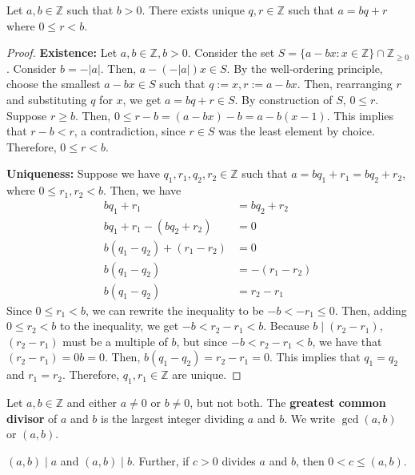 \documentclass [12pt] {article}
\newcommand{\Z}{\mathbb{Z}}
\newenvironment{definition}[1]{\begin{tcolorbox}[title={Definition: #1},colback=blue!5!white,colframe=black!75!blue]}{\end{tcolorbox}}
\newenvironment{theorem}[1]{\begin{tcolorbox}[title={Theorem #1},colback=green!5!white,colframe=black!75!green]}{\end{tcolorbox}}
\renewcommand{\bf}[1]{\textbf{{#1}}}
\begin{document}
\begin{theorem}{(Division Algorithm)}
    \label{thm:divalgo}
    Let $a, b \in \Z$ such that $b > 0$. There exists unique $q, r \in \Z$ such that $a = bq + r$
    where $0 \leq r < b$.
\end{theorem}
\begin{proof}
    \bf{Existence:} 
    Let $a, b \in \Z, b > 0$. Consider the set $S = \{ a - bx : x \in \Z \} \cap \Z_{\geq 0}$.
    Consider $b = -|a|$. Then, $a - (-|a|)x \in S$. By the well-ordering principle, choose the 
    smallest $a - bx \in S$ such that $q := x, r := a - bx$. Then, rearranging $r$ and substituting
    $q$ for $x$, we get $a = bq + r \in S$. By construction of $S$, $0 \leq r$. Suppose $r \geq b$.
    Then, $0 \leq r - b = (a - bx) - b = a - b(x - 1)$. This implies that $r - b < r$, a
    contradiction, since $r \in S$ was the least element by choice. Therefore, $0 \leq r < b$.
    \vspace{0.5em}

    \bf{Uniqueness:}
    Suppose we have $q_1, r_1, q_2, r_2 \in \Z$ such that $a = bq_1 + r_1 = bq_2 + r_2$, where 
    $0 \leq r_1, r_2 < b$. Then, we have
    \begin{align*}
        bq_1 + r_1 &= bq_2 + r_2 \\
        bq_1 + r_1 - (bq_2 + r_2) &= 0 \\
        b(q_1 - q_2) + (r_1 - r_2) &= 0 \\
        b(q_1 - q_2) &= -(r_1 - r_2) \\
        b(q_1 - q_2) &= r_2 - r_1
    \end{align*}
    Since $0 \leq r_1 < b$, we can rewrite the inequality to be $-b < -r_1 \leq 0$. Then, adding $0
    \leq r_2 < b$ to the inequality, we get $-b < r_2 - r_1 < b$. Because $b \mid (r_2 - r_1)$,
    $(r_2 - r_1)$ must be a multiple of $b$, but since $-b < r_2 - r_1 < b$, we have that 
    $(r_2 - r_1) = 0b = 0$. Then, $b(q_1 - q_2) = r_2 - r_1 = 0$. This implies that $q_1 = q_2$ and
    $r_1 = r_2$. Therefore, $q_1, r_1 \in \Z$ are unique.
\end{proof}

\begin{definition}{Greatest Common Divisor (gcd)}
    Let $a, b \in \Z$ and either $a \neq 0$ or $b \neq 0$, but not both. The \bf{greatest common
    divisor} of $a$ and $b$ is the largest integer dividing $a$ and $b$. We write $\gcd(a, b)$ or
    $(a, b)$. \vspace{1em}

    $(a, b) \mid a$ and $(a, b) \mid b$. Further, if $c > 0$ divides $a$ and $b$, then $0 < c \leq (a, b)$.
\end{definition}
\end{document}
